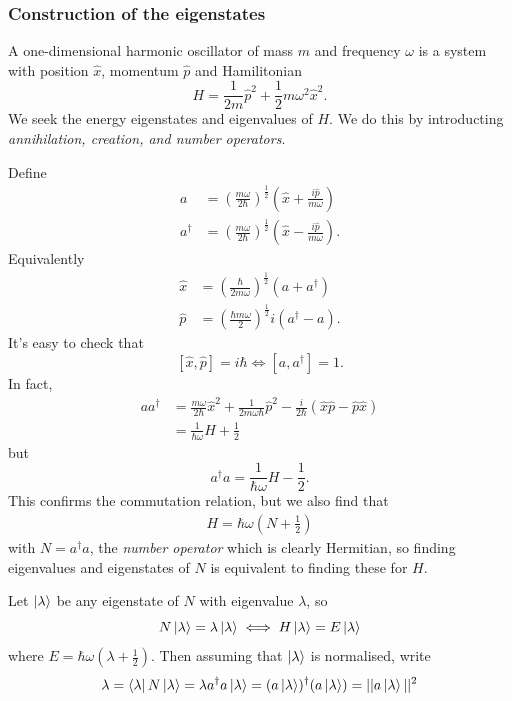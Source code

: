 \documentclass{article}
\begin{document}
\subsubsection{Construction of the eigenstates}
A one-dimensional harmonic oscillator of mass $ m $ and frequency $ \omega $ is a system with position $ \hat x $, momentum $ \hat p $ and Hamilitonian
\[
	 H = \frac 1{2m} \hat p^2 + \frac  12 m \omega^2 \hat x^2.
\]
We seek the energy eigenstates and eigenvalues of $ H $. We do this by introducting \textit{annihilation, creation, and number operators}.\par
Define
\begin{align*}
	a &= \left(\frac {m\omega}{2\hbar}\right)^{\frac 12}\left(\hat x + \frac{i\hat  p }{m \omega}\right) \\
	a^\dagger &= \left(\frac {m\omega}{2\hbar}\right)^{\frac 12}\left(\hat x - \frac{i\hat p}{m\omega}\right).
	\end{align*}
Equivalently 
\begin{align*}
	\hat x &= \left(\frac \hbar{2 m \omega}\right)^{\frac 12} \left( a + a^\dagger\right) \\
   \hat p &= \left(\frac {\hbar m \omega}2\right)^{\frac 12}i\left( a^\dagger - a\right).
\end{align*}
It's easy to check that
\[
	[\hat x, \hat p] = i\hbar \iff [a, a^\dagger] = 1.
\]
In fact,
\begin{align*}
	aa^\dagger  &= \frac{m\omega}{2\hbar} \hat x^2 + \frac 1{2m\omega \hbar} \hat p ^2 - \frac i{2\hbar} (\hat x \hat p - \hat p \hat x) \\
	&= \frac 1{\hbar \omega} H + \frac 12
\end{align*}
but
\[
	a^\dagger a = \frac 1{\hbar \omega} H - \frac 12.
\]
This confirms the commutation relation, but we also find that
\begin{align*}
  H = \hbar \omega \left(N + \frac 12\right)
\end{align*}
with $ N = a^\dagger a $, the \textit{number operator} which is clearly Hermitian, so finding eigenvalues and eigenstates of $ N $ is equivalent to finding these for $ H $.\par
Let $ \ket \lambda $ be any eigenstate of $ N $ with eigenvalue $ \lambda $, so
\[
  N \ket \lambda = \lambda \ket \lambda \iff H \ket \lambda = E \ket \lambda
\]
where $ E = \hbar \omega\left(\lambda + \frac 12 \right) $. Then assuming that $ \ket \lambda $ is normalised, write
\[
	\lambda = \bra\lambda N \ket \lambda = \lambda a^\dagger a \ket \lambda = (a\ket\lambda)^\dagger (a\ket \lambda) = ||a\ket \lambda||^2
\]
\end{document}
